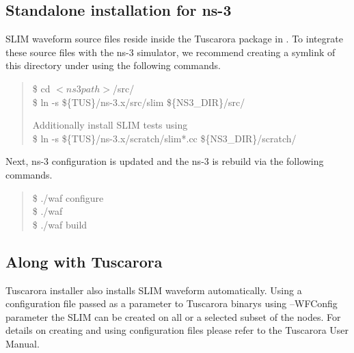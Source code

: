 \subsection{Standalone installation for ns-3} \label{sec:install_standalone}

SLIM waveform source files reside inside the Tuscarora package in . 
To integrate these source files with the ns-3 simulator, we recommend creating a symlink of this directory under  using the following commands.

\begin{quote}
	\$ cd $<ns3path>$/src/\\
	\$ ln -s \$\{TUS\}/ns-3.x/src/slim \$\{NS3\_DIR\}/src/
	
	Additionally install SLIM tests using \\
	\$ ln -s \$\{TUS\}/ns-3.x/scratch/slim*.cc \$\{NS3\_DIR\}/scratch/
\end{quote}

Next, ns-3 configuration is updated and the ns-3 is rebuild via the following commands.

\begin{quote}
	\$ ./waf configure\\
	\$ ./waf\\
	\$ ./waf build
\end{quote}

\subsection{Along with Tuscarora} \label{sec:install_wTusc}

Tuscarora installer also installs SLIM waveform automatically. 
Using a configuration file passed as a parameter to Tuscarora binarys using --WFConfig parameter the SLIM can be created on all or a selected subset of the nodes. 
For details on creating and using configuration files please refer to the Tuscarora User Manual.






